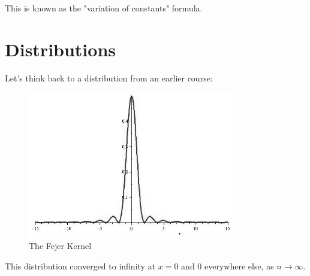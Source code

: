 This is known as the "variation of constants" formula.

\section{Distributions}
Let's think back to a distribution from an earlier course:
\begin{figure}[htpb]
	\centering
	\includegraphics[width=0.8\textwidth]{./figures/Fejer-kernel.png}
	\caption{The Fejer Kernel}
	\label{fig:}
\end{figure}

This distribution converged to infinity at $x = 0$ and 0 everywhere else, as $n \to \infty$. 

